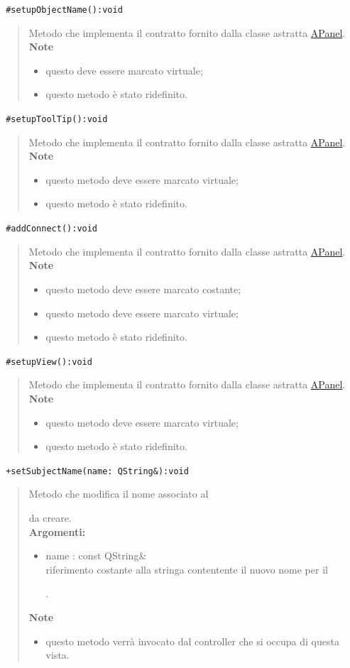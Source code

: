 \color{blue}\verb! #setupObjectName():void!
\begin{quote}
\color{black}Metodo che implementa il contratto fornito dalla classe astratta \hyperref[speAPanel]{APanel}.\\
 \textbf{Note}
 \begin{itemize}
  \item questo deve essere marcato virtuale;
 \item questo metodo è stato ridefinito.
 \end{itemize}
\end{quote} 
\color{blue}\verb! #setupToolTip():void!
\begin{quote}
\color{black}Metodo che implementa il contratto fornito dalla classe astratta \hyperref[speAPanel]{APanel}.\\
 \textbf{Note}
 \begin{itemize}
 \item questo metodo deve essere marcato virtuale;
 \item questo metodo è stato ridefinito.
 \end{itemize}
\end{quote} 
\color{blue}\verb! #addConnect():void!
\begin{quote}
\color{black}Metodo che implementa il contratto fornito dalla classe astratta \hyperref[speAPanel]{APanel}.\\
 \textbf{Note}
 \begin{itemize}
 \item questo metodo deve essere marcato costante;
 \item questo metodo deve essere marcato virtuale;
 \item questo metodo è stato ridefinito.
 \end{itemize}
\end{quote} 
\color{blue}\verb! #setupView():void!
\begin{quote}
\color{black}Metodo che implementa il contratto fornito dalla classe astratta \hyperref[speAPanel]{APanel}.\\
 \textbf{Note}
 \begin{itemize}
 \item questo metodo deve essere marcato virtuale;
 \item questo metodo è stato ridefinito.
 \end{itemize}
\end{quote}
\color{blue}\verb! +setSubjectName(name: QString&):void!
\begin{quote}
\color{black} Metodo che modifica il nome associato al \subject{} da creare.  \\
 \textbf{Argomenti:}
 \begin{itemize}
\item name : const QString\& \\ riferimento costante alla stringa contentente il nuovo nome per il \subject{}.
\end{itemize}
 \textbf{Note}
 \begin{itemize}
 \item questo metodo verrà invocato dal controller che si occupa di questa vista.
 \end{itemize}
\end{quote}
